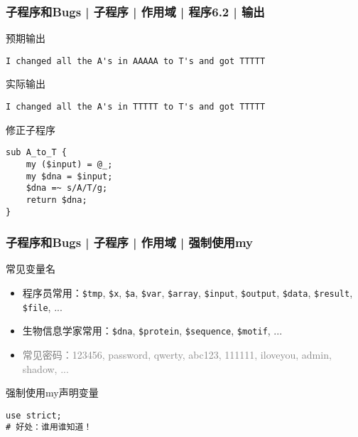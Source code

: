 \begin{frame}[fragile]
  \frametitle{子程序和Bugs | 子程序 | 作用域 | 程序6.2 | 输出}
  \begin{block}{预期输出}
\begin{lstlisting}[basicstyle=\footnotesize\tt]
I changed all the A's in AAAAA to T's and got TTTTT 
\end{lstlisting}
    \vspace{-0.5em}
  \end{block}
  \vspace{-0.3em}
  \pause
  \begin{block}{实际输出}
\begin{lstlisting}[basicstyle=\footnotesize\tt]
I changed all the A's in TTTTT to T's and got TTTTT 
\end{lstlisting}
    \vspace{-0.5em}
  \end{block}
  \vspace{-0.3em}
  \pause
  \begin{block}{修正子程序}
\begin{lstlisting}[basicstyle=\small\tt]
sub A_to_T {
    my ($input) = @_;
    my $dna = $input;
    $dna =~ s/A/T/g;
    return $dna;
}
\end{lstlisting}
    \vspace{-0.5em}
  \end{block}
\end{frame}

\begin{frame}[fragile]
  \frametitle{子程序和Bugs | 子程序 | 作用域 | 强制使用my}
  \begin{block}{常见变量名}
    \begin{itemize}
      \item 程序员常用：\verb|$tmp|, \verb|$x|, \verb|$a|, \verb|$var|, \verb|$array|, \verb|$input|, \verb|$output|, \verb|$data|, \verb|$result|, \verb|$file|, ...
      \item 生物信息学家常用：\verb|$dna|, \verb|$protein|, \verb|$sequence|, \verb|$motif|, ...
      \item \textcolor{gray}{常见密码：123456, password, qwerty, abc123, 111111, iloveyou, admin, shadow, ...}
    \end{itemize}
  \end{block}
  \pause
  \begin{block}{强制使用my声明变量}
\begin{lstlisting}
use strict;
# 好处：谁用谁知道！
\end{lstlisting}
  \end{block}
\end{frame}

